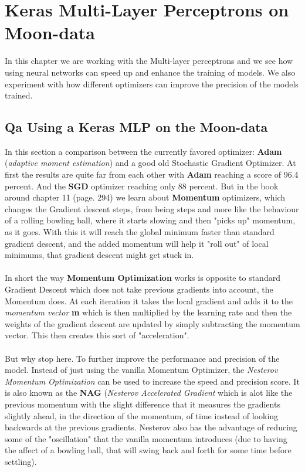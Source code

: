 \documentclass{article}
\begin{document}
\section{Keras Multi-Layer Perceptrons on Moon-data}
In this chapter we are working with the Multi-layer perceptrons and we see how using neural networks can speed up and enhance the training of models. We also experiment with how different optimizers can improve the precision of the models trained.

\subsection{Qa Using a Keras MLP on the Moon-data}
In this section a comparison between the currently favored optimizer: \textbf{Adam} (\textit{adaptive moment estimation}) and a good old Stochastic Gradient Optimizer. At first the results are quite far from each other with \textbf{Adam} reaching a score of 96.4 percent. And the \textbf{SGD} optimizer reaching only 88 percent. But in the book around chapter 11 (page. 294) we learn about \textbf{Momentum} optimizers, which changes the Gradient descent steps, from being steps and more like the behaviour of a rolling bowling ball, where it starts slowing and then "picks up" momentum, as it goes. With this it will reach the global minimum faster than standard gradient descent, and the added momentum will help it "roll out" of local minimums, that gradient descent might get stuck in. 
\\ \\
In short the way \textbf{Momentum Optimization} works is opposite to standard Gradient Descent which does not take previous gradients into account, the Momentum does. At each iteration it takes the local gradient and adds it to the \textit{momentum vector} \textbf{m} which is then multiplied by the learning rate and then the weights of the gradient descent are updated by simply subtracting the momentum vector. This then creates this sort of "acceleration".
\\ \\
But why stop here. To further improve the performance and precision of the model. Instead of just using the vanilla Momentum Optimizer, the \textit{Nesterov Momentum Optimization} can be used to increase the speed and precision score. It is also known as the \textbf{NAG} (\textit{Nesterov Accelerated Gradient} which is alot like the previous momentum with the slight difference that it measures the gradients slightly ahead, in the direction of the momentum,  of time instead of looking backwards at the previous gradients. Nesterov also has the advantage of reducing some of the "oscillation" that the vanilla momentum introduces (due to having the affect of a bowling ball, that will swing back and forth for some time before settling).
\end{document}
